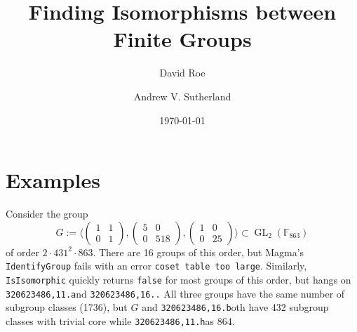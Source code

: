 \documentclass{article}
\title{Finding Isomorphisms between Finite Groups}
\author{David Roe}
\author{Andrew V. Sutherland}
\date{\today}
\newcommand{\gid}[2]{\texttt{#1.#2}}
\newcommand{\FF}{\mathbb{F}}
\DeclareMathOperator{\GL}{GL}
\begin{document}
\maketitle

\section{Examples}

Consider the group
$$G := \langle \begin{pmatrix} 1 & 1 \\ 0 & 1 \end{pmatrix}, \begin{pmatrix} 5 & 0 \\ 0 & 518 \end{pmatrix}, \begin{pmatrix} 1 & 0 \\ 0 & 25 \end{pmatrix} \rangle \subset \GL_2(\FF_{863})$$
of order $2 \cdot 431^2 \cdot 863$.  There are 16 groups of this order, but Magma's \texttt{IdentifyGroup} fails with an error \texttt{coset table too large}.  Similarly, \texttt{IsIsomorphic} quickly returns \texttt{false} for most groups of this order, but hangs on \gid{320623486,11} and \gid{320623486,16}.  All three groups have the same number of subgroup classes (1736), but $G$ and \gid{320623486,16} both have 432 subgroup classes with trivial core while \gid{320623486,11} has 864.
\end{document}
